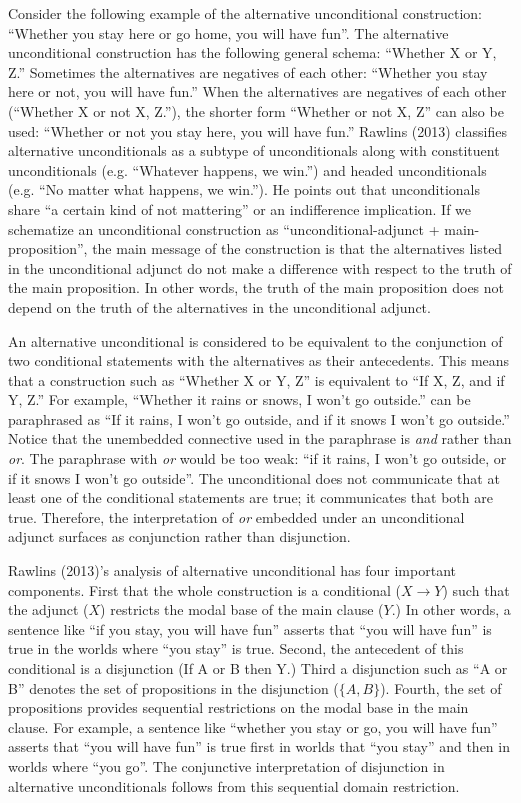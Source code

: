 \documentclass[oneside]{report}
\theoremstyle{definition}
\theoremstyle{definition}
\theoremstyle{definition}
\theoremstyle{remark}
\begin{document}
Consider the following example of the alternative unconditional
construction: ``Whether you stay here or go home, you will have fun''.
The alternative unconditional construction has the following general
schema: ``Whether X or Y, Z.'' Sometimes the alternatives are negatives
of each other: ``Whether you stay here or not, you will have fun.'' When
the alternatives are negatives of each other (``Whether X or not X,
Z.''), the shorter form ``Whether or not X, Z'' can also be used:
``Whether or not you stay here, you will have fun.'' Rawlins (2013)
classifies alternative unconditionals as a subtype of unconditionals
along with constituent unconditionals (e.g. ``Whatever happens, we
win.'') and headed unconditionals (e.g. ``No matter what happens, we
win.''). He points out that unconditionals share ``a certain kind of not
mattering'' or an indifference implication. If we schematize an
unconditional construction as ``unconditional-adjunct +
main-proposition'', the main message of the construction is that the
alternatives listed in the unconditional adjunct do not make a
difference with respect to the truth of the main proposition. In other
words, the truth of the main proposition does not depend on the truth of
the alternatives in the unconditional adjunct.

An alternative unconditional is considered to be equivalent to the
conjunction of two conditional statements with the alternatives as their
antecedents. This means that a construction such as ``Whether X or Y,
Z'' is equivalent to ``If X, Z, and if Y, Z.'' For example, ``Whether it
rains or snows, I won't go outside.'' can be paraphrased as ``If it
rains, I won't go outside, and if it snows I won't go outside.'' Notice
that the unembedded connective used in the paraphrase is \emph{and}
rather than \emph{or}. The paraphrase with \emph{or} would be too weak:
``if it rains, I won't go outside, or if it snows I won't go outside''.
The unconditional does not communicate that at least one of the
conditional statements are true; it communicates that both are true.
Therefore, the interpretation of \emph{or} embedded under an
unconditional adjunct surfaces as conjunction rather than disjunction.

Rawlins (2013)'s analysis of alternative unconditional has four
important components. First that the whole construction is a conditional
(\(X\rightarrow Y\)) such that the adjunct (\(X\)) restricts the modal
base of the main clause (\(Y\).) In other words, a sentence like ``if
you stay, you will have fun'' asserts that ``you will have fun'' is true
in the worlds where ``you stay'' is true. Second, the antecedent of this
conditional is a disjunction (If A or B then Y.) Third a disjunction
such as ``A or B'' denotes the set of propositions in the disjunction
(\(\{A, B\}\)). Fourth, the set of propositions provides sequential
restrictions on the modal base in the main clause. For example, a
sentence like ``whether you stay or go, you will have fun'' asserts that
``you will have fun'' is true first in worlds that ``you stay'' and then
in worlds where ``you go''. The conjunctive interpretation of
disjunction in alternative unconditionals follows from this sequential
domain restriction.
\end{document}

